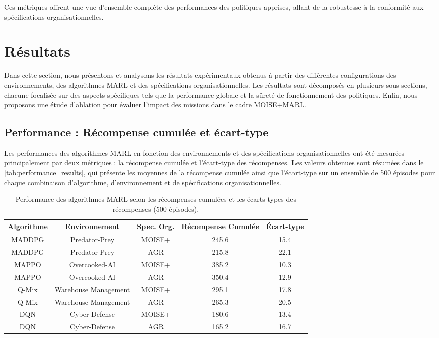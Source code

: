 \documentclass[sigconf,anonymous]{aamas}
\begin{document}
Ces métriques offrent une vue d'ensemble complète des performances des politiques apprises, allant de la robustesse à la conformité aux spécifications organisationnelles.

\section{Résultats}
\label{sec:results}

Dans cette section, nous présentons et analysons les résultats expérimentaux obtenus à partir des différentes configurations des environnements, des algorithmes MARL et des spécifications organisationnelles. Les résultats sont décomposés en plusieurs sous-sections, chacune focalisée sur des aspects spécifiques tels que la performance globale et la sûreté de fonctionnement des politiques. Enfin, nous proposons une étude d'ablation pour évaluer l'impact des missions dans le cadre MOISE+MARL.

\subsection{Performance : Récompense cumulée et écart-type}

Les performances des algorithmes MARL en fonction des environnements et des spécifications organisationnelles ont été mesurées principalement par deux métriques : la récompense cumulée et l'écart-type des récompenses. Les valeurs obtenues sont résumées dans le \autoref{tab:performance_results}, qui présente les moyennes de la récompense cumulée ainsi que l'écart-type sur un ensemble de 500 épisodes pour chaque combinaison d'algorithme, d'environnement et de spécifications organisationnelles.

\begin{table*}[h!]
    \centering
    \caption{Performance des algorithmes MARL selon les récompenses cumulées et les écarts-types des récompenses (500 épisodes).}
    \label{tab:performance_results}
    \begin{tabular}{|c|c|c|c|c|}
        \hline
        \textbf{Algorithme} & \textbf{Environnement} & \textbf{Spec. Org.} & \textbf{Récompense Cumulée} & \textbf{Écart-type} \\ \hline
        MADDPG & Predator-Prey & MOISE+ & 245.6 & 15.4 \\ \hline
        MADDPG & Predator-Prey & AGR & 215.8 & 22.1 \\ \hline
        MAPPO & Overcooked-AI & MOISE+ & 385.2 & 10.3 \\ \hline
        MAPPO & Overcooked-AI & AGR & 350.4 & 12.9 \\ \hline
        Q-Mix & Warehouse Management & MOISE+ & 295.1 & 17.8 \\ \hline
        Q-Mix & Warehouse Management & AGR & 265.3 & 20.5 \\ \hline
        DQN & Cyber-Defense & MOISE+ & 180.6 & 13.4 \\ \hline
        DQN & Cyber-Defense & AGR & 165.2 & 16.7 \\ \hline
    \end{tabular}
\end{table*}
\end{document}
